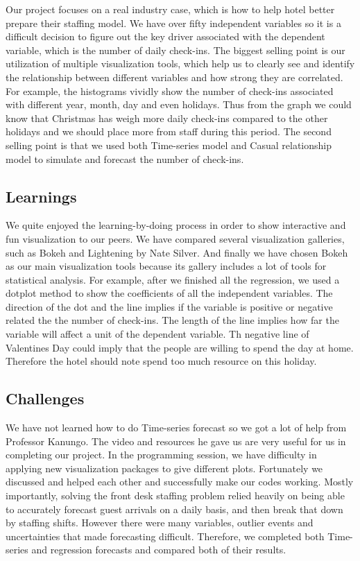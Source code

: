 \documentclass{article}
\begin{document}
Our project focuses on a real industry case, which is how to help hotel better prepare their staffing model. We have over fifty independent variables so it is a difficult decision to figure out the key driver associated with the dependent variable, which is the number of daily check-ins. The biggest selling point is our utilization of multiple visualization tools, which help us to clearly see and identify the relationship between different variables and how strong they are correlated. For example, the histograms vividly show the number of check-ins associated with different year, month, day and even holidays. Thus from the graph we could know that Christmas has weigh more daily check-ins compared to the other holidays and we should place more from staff during this period. The second selling point is that we used both Time-series model and Casual relationship model to simulate and forecast the number of check-ins.

\subsection{Learnings}

We quite enjoyed the learning-by-doing process in order to show interactive and fun visualization to our peers. We have compared several visualization galleries, such as Bokeh and Lightening by Nate Silver. And finally we have chosen Bokeh as our main visualization tools because its gallery includes a lot of tools for statistical analysis. For example, after we finished all the regression, we used a dotplot method to show the coefficients of all the independent variables. The direction of the dot and the line implies if the variable is positive or negative related the the number of check-ins. The length of the line implies how far the variable will affect a unit of the dependent variable. Th negative line of Valentines Day could imply that the people are willing to spend the day at home. Therefore the hotel should note spend too much resource on this holiday.

\subsection{Challenges}

We have not learned how to do Time-series forecast so we got a lot of help from Professor Kanungo. The video and resources he gave us are very useful for us in completing our project. In the programming session, we have difficulty in applying new visualization packages to give different plots. Fortunately we discussed and helped each other and successfully make our codes working. Mostly importantly, solving the front desk staffing problem relied heavily on being able to accurately forecast guest arrivals on a daily basis, and then break that down by staffing shifts. However there were many variables, outlier events and uncertainties that made forecasting difficult. Therefore, we completed both Time-series and regression forecasts and compared both of their results.
\end{document}
